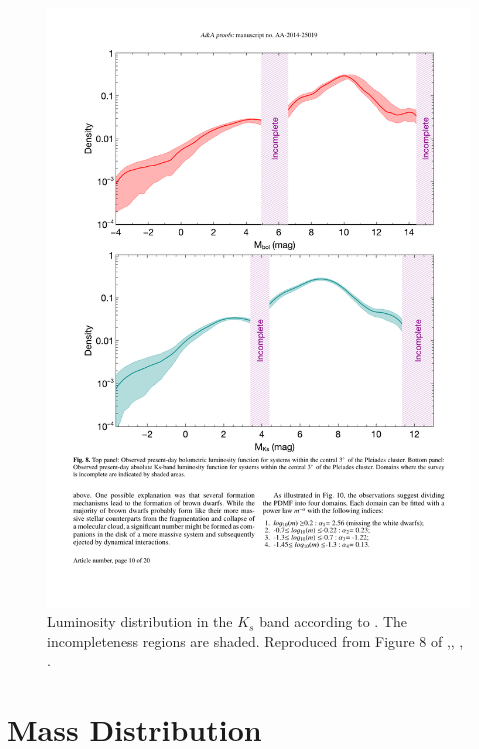 \begin{figure}[ht!]
\begin{center}
\includegraphics[width=\textwidth]{background/Figures/F8_Bouy2015.pdf}
\caption{Luminosity distribution in the $K_s$ band according to \citet{Bouy2015}. The incompleteness regions are shaded. Reproduced from Figure 8 of \citet{Bouy2015},\textit{}, , .}
\label{fig:luminosityBouy}
\end{center}
\end{figure}

\section{Mass Distribution}
\label{sect:mass}

